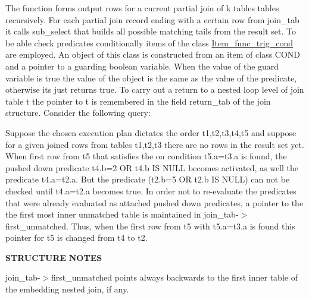 \begin{DoxyParagraph}{}
The function forms output rows for a current partial join of k tables tables recursively. For each partial join record ending with a certain row from join\+\_\+tab it calls sub\+\_\+select that builds all possible matching tails from the result set. To be able check predicates conditionally items of the class \mbox{\hyperlink{classItem__func__trig__cond}{Item\+\_\+func\+\_\+trig\+\_\+cond}} are employed. An object of this class is constructed from an item of class C\+O\+ND and a pointer to a guarding boolean variable. When the value of the guard variable is true the value of the object is the same as the value of the predicate, otherwise it\textquotesingle{}s just returns true. To carry out a return to a nested loop level of join table t the pointer to t is remembered in the field \textquotesingle{}return\+\_\+tab\textquotesingle{} of the join structure. Consider the following query\+: 
\begin{DoxyCode}{0}
\end{DoxyCode}
 Suppose the chosen execution plan dictates the order t1,t2,t3,t4,t5 and suppose for a given joined rows from tables t1,t2,t3 there are no rows in the result set yet. When first row from t5 that satisfies the on condition t5.\+a=t3.\+a is found, the pushed down predicate t4.\+b=2 OR t4.\+b IS N\+U\+LL becomes \textquotesingle{}activated\textquotesingle{}, as well the predicate t4.\+a=t2.\+a. But the predicate (t2.\+b=5 OR t2.\+b IS N\+U\+LL) can not be checked until t4.\+a=t2.\+a becomes true. In order not to re-\/evaluate the predicates that were already evaluated as attached pushed down predicates, a pointer to the the first most inner unmatched table is maintained in join\+\_\+tab-\/$>$first\+\_\+unmatched. Thus, when the first row from t5 with t5.\+a=t3.\+a is found this pointer for t5 is changed from t4 to t2. ~\newline
 
\end{DoxyParagraph}
\begin{DoxyParagraph}{}
{\bfseries S\+T\+R\+U\+C\+T\+U\+RE} {\bfseries N\+O\+T\+ES} 
\end{DoxyParagraph}
\begin{DoxyParagraph}{}
join\+\_\+tab-\/$>$first\+\_\+unmatched points always backwards to the first inner table of the embedding nested join, if any.
\end{DoxyParagraph}

